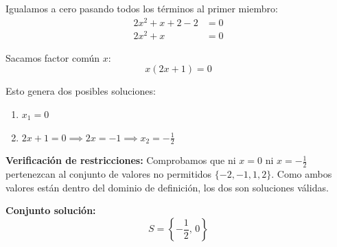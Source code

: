 \documentclass[11pt,a4paper]{article}
\begin{document}
Igualamos a cero pasando todos los términos al primer miembro:
\begin{align*}
    2x^2 + x + 2 - 2 &= 0 \\
    2x^2 + x &= 0
\end{align*}

Sacamos factor común $x$:
\begin{equation*}
    x(2x + 1) = 0
\end{equation*}

Esto genera dos posibles soluciones:
\begin{enumerate}
    \item $x_1 = 0$
    \item $2x + 1 = 0 \implies 2x = -1 \implies x_2 = -\frac{1}{2}$
\end{enumerate}

\noindent \textbf{Verificación de restricciones:} 
Comprobamos que ni $x = 0$ ni $x = -\frac{1}{2}$ pertenezcan al conjunto de valores no permitidos $\{-2, -1, 1, 2\}$. Como ambos valores están dentro del dominio de definición, los dos son soluciones válidas.

\vspace{0.3cm}
\noindent \textbf{Conjunto solución:}
\begin{equation*}
    S = \left\{ -\frac{1}{2}, \, 0 \right\}
\end{equation*}
\end{document}
